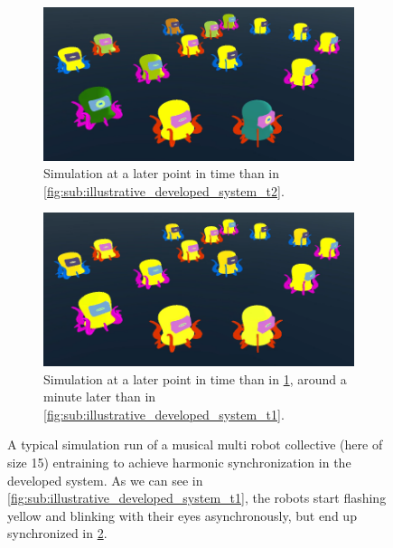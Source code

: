 \begin{figure}[ht!]
\begin{subfigure}[b]{0.5\textwidth}
	\includegraphics[width=\textwidth]{Assets/DocSegments/Chapters/Introduction/Figures/illustrative_system_result_figure_t3.png}
	\caption{Simulation at a later point in time than in \ref{fig:sub:illustrative_developed_system_t2}. }
	\label{fig:sub:illustrative_developed_system_t3}
  \end{subfigure}
  \begin{subfigure}[b]{0.5\textwidth}
	\centering\captionsetup{width=.9\linewidth}%
	\includegraphics[width=\textwidth]{Assets/DocSegments/Chapters/Introduction/Figures/illustrative_system_result_figure_t4.png}
	\caption{Simulation at a later point in time than in \ref{fig:sub:illustrative_developed_system_t3}, around a minute later than in \ref{fig:sub:illustrative_developed_system_t1}.}
	\label{fig:sub:illustrative_developed_system_t4}
  \end{subfigure}
  \caption{A typical simulation run of a musical multi robot collective (here of size 15) entraining to achieve harmonic synchronization in the developed system. As we can see in \ref{fig:sub:illustrative_developed_system_t1}, the robots start flashing yellow and blinking with their eyes asynchronously, but end up synchronized in \ref{fig:sub:illustrative_developed_system_t4}.}
  \label{fig:illustrative_developed_system}
\end{figure}



